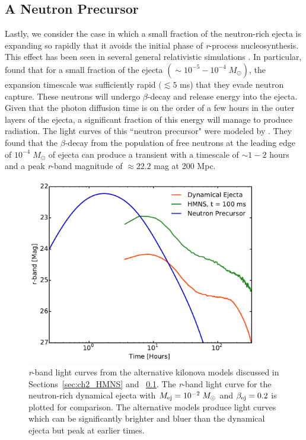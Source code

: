 \subsection{A Neutron Precursor}
\label{sec:ch2_neutronpre}
Lastly, we consider the case in which a small fraction of the neutron-rich ejecta is expanding so rapidly that it avoids the initial phase of {\em r}-process nucleosynthesis. This effect has been seen in several general relativistic simulations \citep{Bauswein+13b,Goriely+15,Just+15}. In particular, \citet{Bauswein+13b} found that for a small fraction of the ejecta $(\sim 10^{-5} - 10^{-4}\; M_{\odot})$, the expansion timescale was sufficiently rapid $(\lesssim 5$ ms) that they evade neutron capture. These neutrons will undergo $\beta$-decay and release energy into the ejecta. Given that the photon diffusion time is on the order of a few hours in the outer layers of the ejecta, a significant fraction of this energy will manage to produce radiation. The light curves of this ``neutron precursor" were modeled by \citet{Metzger+15}. They found that the $\beta$-decay from the population of free neutrons at the leading edge of $10^{-4}\;M_{\odot}$ of ejecta can produce a transient with a timescale of $\sim1-2$ hours and a peak {\em r}-band magnitude of $\approx 22.2$ mag at 200 Mpc.

\begin{figure}[h!]
\centering
\includegraphics[width=0.9\textwidth]{./figs/chapter2/ch2_f18.pdf}
\caption{{\em r}-band light curves from the alternative kilonova models discussed in Sections~\ref{sec:ch2_HMNS} and ~\ref{sec:ch2_neutronpre}. The {\em r}-band light curve for the neutron-rich dynamical ejecta with $M_{{\rm ej}} = 10^{-2}\;M_{\odot}$ and $\beta_{{\rm ej}} = 0.2$ is plotted for comparison. The alternative models produce light curves which can be significantly brighter and bluer than the dynamical ejecta but peak at earlier times.}
\label{fig:ch2_altLC}
\end{figure}

